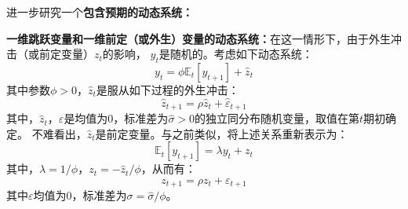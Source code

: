 进一步研究一个\textbf{包含预期的动态系统：}
\begin{example} \label{eg-one-non-predetermind-one-exo}
    \textbf{一维跳跃变量和一维前定（或外生）变量的动态系统：}在这一情形下，由于外生冲击（或前定变量）$z_t$的影响，
    $y_t$是随机的。考虑如下动态系统：
    \begin{equation*}
        y_t = \phi \mathbb{E}_t \left[y_{t+1}\right] + \hat{z}_t
    \end{equation*}
    其中参数$\phi>0$，$\hat{z}_t$是服从如下过程的外生冲击：
    \begin{equation*}
        \hat{z}_{t+1} = \rho \hat{z}_t + \hat{\varepsilon}_{t+1}
    \end{equation*}
    其中，$\hat{z}_t$，$\varepsilon$是均值为0，标准差为$\hat{\sigma}>0$的独立同分布随机变量，取值在第$t$期初确定。
    不难看出，$\hat{z}_t$是前定变量。与之前类似，将上述关系重新表示为：
    \begin{equation}   \label{eq-one-non-predetermind-one-exo-dynamic-yprime}
        \mathbb{E}_t \left[y_{t+1}\right] = \lambda y_t + z_t 
    \end{equation}
    其中，$\lambda = 1/\phi$，$z_t = -\hat{z}_t / \phi$，从而有：
    \begin{equation*}
        z_{t+1} = \rho z_t + \varepsilon_{t+1}
    \end{equation*}
    其中$\varepsilon$均值为0，标准差为$\sigma = \hat{\sigma}/\phi$。


\end{example}
